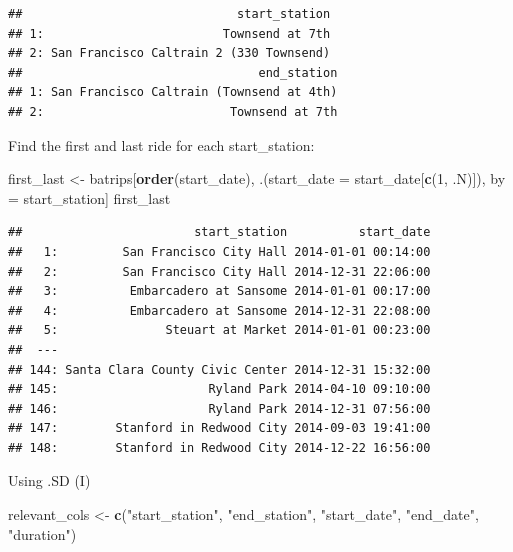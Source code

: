 \documentclass[]{book}
\newenvironment{Shaded}{\begin{snugshade}}{\end{snugshade}}
\newcommand{\DataTypeTok}[1]{\textcolor[rgb]{0.13,0.29,0.53}{#1}}
\newcommand{\DecValTok}[1]{\textcolor[rgb]{0.00,0.00,0.81}{#1}}
\newcommand{\KeywordTok}[1]{\textcolor[rgb]{0.13,0.29,0.53}{\textbf{#1}}}
\newcommand{\NormalTok}[1]{#1}
\newcommand{\StringTok}[1]{\textcolor[rgb]{0.31,0.60,0.02}{#1}}
\begin{document}
\begin{verbatim}
##                              start_station
## 1:                         Townsend at 7th
## 2: San Francisco Caltrain 2 (330 Townsend)
##                                 end_station
## 1: San Francisco Caltrain (Townsend at 4th)
## 2:                          Townsend at 7th
\end{verbatim}

Find the first and last ride for each start\_station:

\begin{Shaded}
\begin{Highlighting}[]
\NormalTok{first_last <-}\StringTok{ }\NormalTok{batrips[}\KeywordTok{order}\NormalTok{(start_date), }
\NormalTok{                      .(}\DataTypeTok{start_date =}\NormalTok{ start_date[}\KeywordTok{c}\NormalTok{(}\DecValTok{1}\NormalTok{, .N)]), }
\NormalTok{                      by =}\StringTok{ }\NormalTok{start_station]}
\NormalTok{first_last}
\end{Highlighting}
\end{Shaded}

\begin{verbatim}
##                        start_station          start_date
##   1:         San Francisco City Hall 2014-01-01 00:14:00
##   2:         San Francisco City Hall 2014-12-31 22:06:00
##   3:          Embarcadero at Sansome 2014-01-01 00:17:00
##   4:          Embarcadero at Sansome 2014-12-31 22:08:00
##   5:               Steuart at Market 2014-01-01 00:23:00
##  ---                                                    
## 144: Santa Clara County Civic Center 2014-12-31 15:32:00
## 145:                     Ryland Park 2014-04-10 09:10:00
## 146:                     Ryland Park 2014-12-31 07:56:00
## 147:        Stanford in Redwood City 2014-09-03 19:41:00
## 148:        Stanford in Redwood City 2014-12-22 16:56:00
\end{verbatim}

Using .SD (I)

\begin{Shaded}
\begin{Highlighting}[]
\NormalTok{relevant_cols <-}\StringTok{ }\KeywordTok{c}\NormalTok{(}\StringTok{"start_station"}\NormalTok{, }\StringTok{"end_station"}\NormalTok{, }
                   \StringTok{"start_date"}\NormalTok{, }\StringTok{"end_date"}\NormalTok{, }\StringTok{"duration"}\NormalTok{)}
\end{Highlighting}
\end{Shaded}
\end{document}
